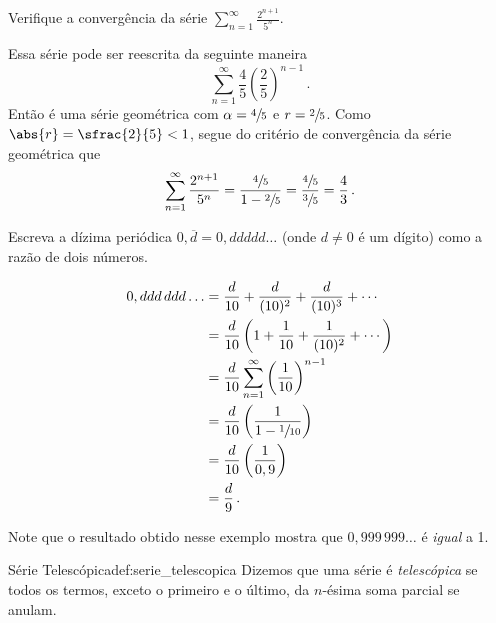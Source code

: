 \begin{example}
  Verifique a convergência da série
  \(
    \sum_{n=1}^\infty \frac{2^{n+1}}{5^n}
  \).

  \solution
  Essa série pode ser reescrita da seguinte maneira
  \[
    \sum_{n=1}^\infty \frac{4}{5}\left(\frac{2}{5}\right)^{n-1}  \,.
  \]
  Então é uma série geométrica com $\alpha =\sfrac{4}{5}$ e $r=\sfrac{2}{5}$.
  Como $\abs{r}=\sfrac{2}{5}<1$, segue do critério de convergência da série geométrica que
  \[
    \sum_{n=1}^\infty \frac{2^{n+1}}{5^n}
      = \frac{\sfrac{4}{5}}{1-\sfrac{2}{5}}
      = \frac{\sfrac{4}{5}}{\sfrac{3}{5}}
      = \frac{4}{3}    \,.
  \]
\end{example}

\begin{example}
    Escreva a dízima periódica $0,\overline{d}=0,ddddd\dots$
    (onde $d\neq0$ é um dígito) como a razão de dois números.

    \solution
    \begin{align*}
      0,ddd\,ddd\dots & =\frac{d}{10}+\frac{d}{(10)^2}+\frac{d}{(10)^3}+\cdots           \\
                      & =\frac{d}{10}\left(1+\frac{1}{10}+\frac{1}{(10)^2}+\cdots\right) \\
                      & =\frac{d}{10}\sum_{n=1}^\infty \left(\frac{1}{10}\right)^{n-1}   \\
                      & =\frac{d}{10}\left(\frac{1}{1-\sfrac{1}{10}}\right)              \\
                      & =\frac{d}{10}\left(\frac{1}{0,9}\right)                          \\
                      & =\frac{d}{9}                                                     \,.
    \end{align*}
\end{example}

Note que o resultado obtido nesse exemplo mostra que $0,999\,999\dots$ é \emph{igual} a 1.

\begin{definicao}{Série Telescópica}{def:serie_telescopica}
  Dizemos que uma série é \emph{telescópica}
  se todos os termos, exceto o primeiro e o último, da $n$-ésima soma parcial se anulam.
\end{definicao}


